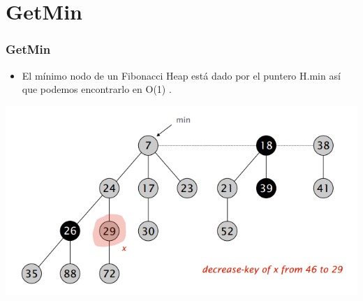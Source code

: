 \documentclass{beamer}
\begin{document}
\section{GetMin}
\begin{frame}
  \frametitle{GetMin}
  \begin{itemize}
    \item El mínimo nodo de un Fibonacci Heap está dado por el puntero H.min así que podemos encontrarlo en O(1) . 
  \end{itemize}
  
   \includegraphics[width =1 \textwidth]{img/decrease/01.png}

\end{frame}
\end{document}
